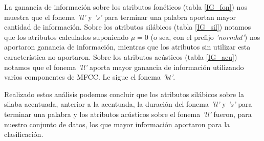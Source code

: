 La ganancia de información sobre los atributos fonéticos (tabla \ref{IG_fon}) nos muestra que el fonema \textit{'ll'} y \textit{'s'} para terminar una palabra aportan mayor cantidad de información. Sobre los atributos silábicos (tabla \ref{IG_sil}) notamos que los atributos calculados suponiendo $\mu = 0$ (o sea, con el prefijo \textit{'normhd'}) nos aportaron ganancia de información, mientras que los atributos sin utilizar esta característica no aportaron. Sobre los atributos acústicos (tabla \ref{IG_acu}) notamos que el fonema \textit{'ll'} aporta mayor ganancia de información utilizando varios componentes de MFCC. Le sigue el fonema \textit{'kt'}. 

Realizado estos análisis podemos concluir que los atributos silábicos sobre la silaba acentuada, anterior a la acentuada, la duración del fonema \textit{'ll'} y \textit{'s'} para terminar una palabra y los atributos acústicos sobre el fonema \textit{'ll'} fueron, para nuestro conjunto de datos, los que mayor información aportaron para la clasificación.




